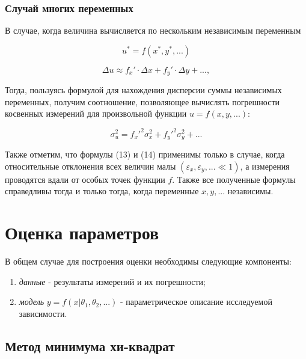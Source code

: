 \documentclass[12pt]{article}
\begin{document}
      \subsubsection{Случай многих переменных}

        В случае, когда величина вычисляется по нескольким независимым переменным

        $$
          u^* = f(x^*, y^*, ...)
        $$

        $$
          \Delta u \approx f_x' \cdot \Delta x + f_y' \cdot \Delta y + ...,
        $$

        Тогда, пользуясь формулой для нахождения дисперсии суммы независимых переменных,
        получим соотношение, позволяющее вычислять погрешности косвенных измерений
        для произвольной функции $u = f(x, y, ...)$:

        \begin{equation}
          \sigma_u^2 = f_x'^2 \sigma_x^2 + f_y'^2 \sigma_y^2 + ...
        \end{equation}

        Также отметим, что формулы (13) и (14) применимы только в случае, когда
        относительные отклонения всех величин малы $(\varepsilon_x, \varepsilon_y, ... \ll 1)$,
        а измерения проводятся вдали от особых точек функции $f$. Также все полученные
        формулы справедливы тогда и только тогда, когда переменные $x, y, ...$ независимы.


  \newpage
  \section{Оценка параметров}

    В общем случае для построения оценки необходимы следующие компоненты:

    \begin{enumerate}

      \item \textit{данные} - результаты измерений и их погрешности;

      \item \textit{модель} $y = f(x | \theta_1, \theta_2, ...)$ - параметрическое
      описание исследуемой зависимости.

    \end{enumerate}

    \subsection{Метод минимума хи-квадрат}
\end{document}
